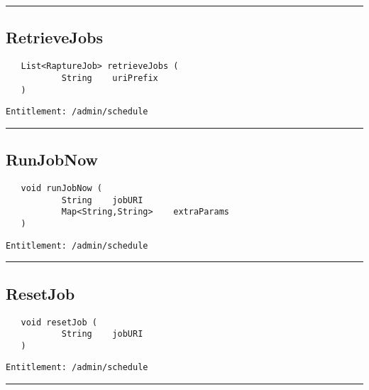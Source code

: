 \rule{12cm}{2pt}
\subsection{RetrieveJobs}
\label{Api:RetrieveJobs}
\begin{verbatim}
   List<RaptureJob> retrieveJobs (
           String    uriPrefix
   )
\end{verbatim}
\begin{Verbatim}[fontsize=\small, formatcom=\color{Maroon}]
  Entitlement: /admin/schedule
\end{Verbatim}



\rule{12cm}{2pt}
\subsection{RunJobNow}
\label{Api:RunJobNow}
\begin{verbatim}
   void runJobNow (
           String    jobURI
           Map<String,String>    extraParams
   )
\end{verbatim}
\begin{Verbatim}[fontsize=\small, formatcom=\color{Maroon}]
  Entitlement: /admin/schedule
\end{Verbatim}



\rule{12cm}{2pt}
\subsection{ResetJob}
\label{Api:ResetJob}
\begin{verbatim}
   void resetJob (
           String    jobURI
   )
\end{verbatim}
\begin{Verbatim}[fontsize=\small, formatcom=\color{Maroon}]
  Entitlement: /admin/schedule
\end{Verbatim}



\rule{12cm}{2pt}
